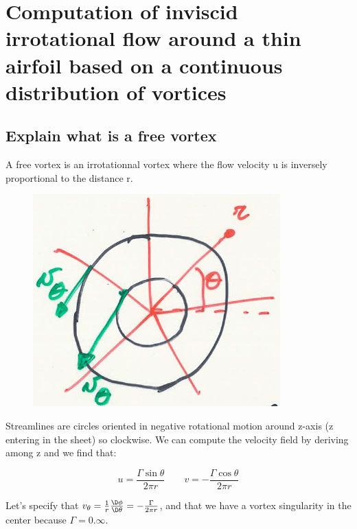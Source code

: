 \documentclass[british,french,11pt, a4paper, openany]{article}
\begin{document}

\section{Computation of inviscid irrotational flow around a thin airfoil based on a	continuous distribution of vortices}
\subsection{Explain what is a free vortex}

A free vortex is an irrotationnal vortex where the flow velocity u is inversely proportional to the distance r.
\begin{figure}
	\vspace{-5mm}
	\includegraphics[scale=0.23]{ch2/26}
\end{figure}

Streamlines are circles oriented in negative rotational motion around z-axis (z entering in the sheet) so clockwise. We can compute the velocity field by deriving among z and we find that: 

\begin{equation}
u = \frac{\Gamma \sin \theta}{2 \pi r} \qquad v = -\frac{\Gamma \cos \theta}{2\pi r}
\end{equation}

Let's specify that $v_\theta = \frac{1}{r} \frac{\D \phi}{\D \theta} = -\frac{\Gamma}{2 \pi r}$, and that we have a vortex singularity in the center because $\Gamma = 0. \infty$.
\end{document}
